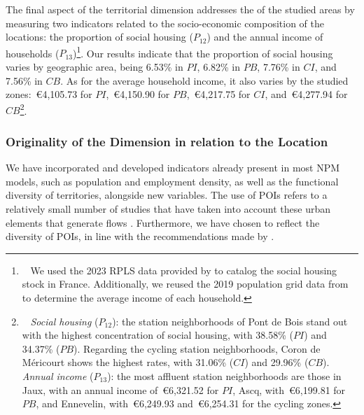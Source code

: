 \begin{refsegment}
The final aspect of the territorial dimension addresses the  of the studied areas by measuring two indicators related to the socio-economic composition of the locations: the proportion of social housing (\(P_{12}\)) and the annual income of households (\(P_{13}\))\footnote{~
    We used the 2023 \acrfull{RPLS} data provided by \textcolor{blue}{\textcite{ministere_de_la_transition_ecologique_et_de_la_cohesion_des_territoires_repertoire_2024}} to catalog the social housing stock in France. Additionally, we reused the 2019 population grid data from \textcolor{blue}{\textcite{insee_grille_2021}} to determine the average income of each household.
}. Our results indicate that the proportion of social housing varies by geographic area, being 6.53\% in \(PI\), 6.82\% in \(PB\), 7.76\% in \(CI\), and 7.56\% in \(CB\). As for the average household income, it also varies by the studied zones:~\euro4,105.73 for \(PI\),~\euro4,150.90 for \(PB\),~\euro4,217.75 for \(CI\), and~\euro4,277.94 for \(CB\)\footnote{~
    \textsl{Social housing} (\(P_{12}\)): the station neighborhoods of Pont de Bois stand out with the highest concentration of social housing, with 38.58\% (\(PI\)) and 34.37\% (\(PB\)). Regarding the cycling station neighborhoods, Coron de Méricourt shows the highest rates, with 31.06\% (\(CI\)) and 29.96\% (\(CB\)).
    \\
    \textsl{Annual income} (\(P_{13}\)): the most affluent station neighborhoods are those in Jaux, with an annual income of~\euro6,321.52 for \(PI\), Ascq, with~\euro6,199.81 for \(PB\), and Ennevelin, with~\euro6,249.93 and~\euro6,254.31 for the cycling zones.
}.%

\subsubsection*{Originality of the Dimension in relation to the Location
    \label{chap6:indicateurs-place-originalite}
    }

We have incorporated and developed indicators already present in most \acrshort{NPM} models, such as population and employment density, as well as the functional diversity of territories, alongside new variables. The use of \acrshort{POIs} refers to a relatively small number of studies that have taken into account these urban elements that generate flows \textcolor{blue}{\autocites[82]{robillard_transit-oriented_2024}[2]{zhou_introducing_2023}}. Furthermore, we have chosen to reflect the diversity of \acrshort{POIs}, in line with the recommendations made by \textcolor{blue}{\textcite[7]{zhang_make_2023}}.
    



\end{refsegment}

